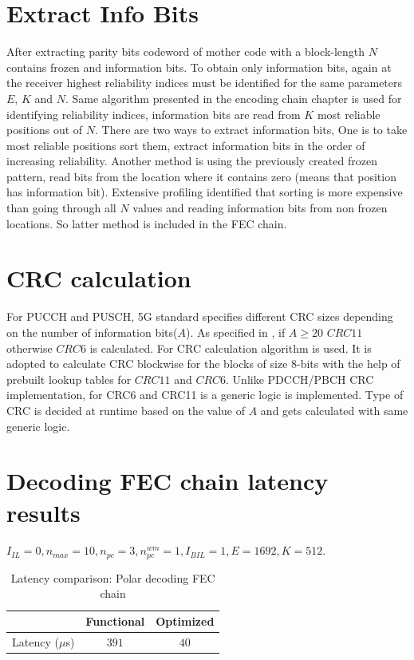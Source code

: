 \section{Extract Info Bits}
After extracting parity bits codeword of mother code with a block-length $N$ contains frozen and information bits. To obtain only information bits, again at the receiver highest reliability indices must be identified for the same parameters $E$, $K$ and $N$. Same algorithm presented in the encoding chain chapter is used for identifying reliability indices, information bits are read from $K$ most reliable positions out of $N$. There are two ways to extract information bits, One is to take most reliable positions sort them, extract information bits in the order of increasing reliability. Another method is using the previously created frozen pattern, read bits from the location where it contains zero (means that position has information bit). Extensive profiling identified that sorting is more expensive than going through all $N$ values and reading information bits from non frozen locations. So latter method is included in the FEC chain.

\section{CRC calculation}
For PUCCH and PUSCH, 5G standard specifies different CRC sizes depending on the number of information bits($A$). As specified in \cite{3gpp.38.212}, if $ A \ge 20$ $ CRC11 $  otherwise $ CRC6 $ is calculated.  For CRC calculation algorithm \cite{Sarwate:1988:CCR:63030.63037} is used. It is adopted to calculate CRC blockwise for the blocks of size 8-bits with the help of prebuilt lookup tables for $ CRC11 $ and $ CRC6 $. Unlike PDCCH/PBCH CRC implementation, for CRC6 and CRC11 is a generic logic is implemented. Type of CRC is decided at runtime based on the value of $A$ and gets calculated with same generic logic.

\section{Decoding FEC chain latency results}

$I_{IL} = 0, n_{max} = 10, n_{pc} = 3 ,n_{pc}^{wm} = 1, I_{BIL} = 1, E = 1692, K = 512$.
\begin{table}[!h]
	\begin{center}
		\caption{Latency comparison: Polar decoding FEC chain}
		\label{tab:decodingFECChainLatency}
		\begin{tabular}{c|c|c} %
			\textbf{ } & Functional & Optimized \\
			\hline
			Latency ($\mu$s) & $391$ & $40$\\
		\end{tabular}
	\end{center}
\end{table}
